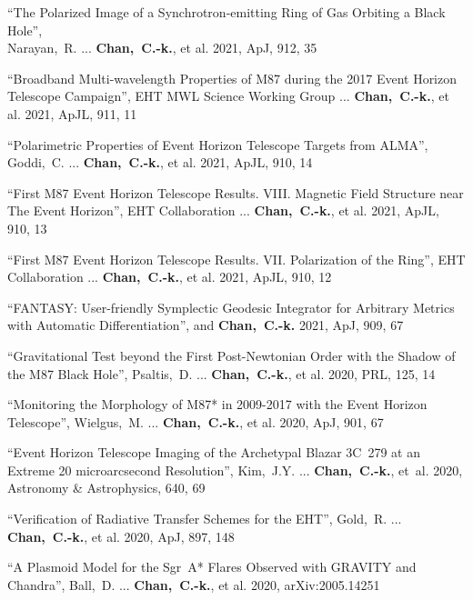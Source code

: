 \begin{ilist}
\item ``The Polarized Image of a Synchrotron-emitting Ring of Gas Orbiting a Black Hole'',\\
  Narayan,~R. ... \textbf{Chan,~C.-k.}, et al.
  2021, ApJ, 912, 35

\item ``Broadband Multi-wavelength Properties of M87 during the 2017 Event Horizon Telescope Campaign'',
  EHT MWL Science Working Group ... \textbf{Chan,~C.-k.}, et al.
  2021, ApJL, 911, 11

\item ``Polarimetric Properties of Event Horizon Telescope Targets from ALMA'',
  Goddi,~C. ... \textbf{Chan,~C.-k.}, et al.
  2021, ApJL, 910, 14

\item ``First M87 Event Horizon Telescope Results. VIII. Magnetic Field Structure near The Event Horizon'',
  EHT Collaboration ... \textbf{Chan,~C.-k.}, et al.
  2021, ApJL, 910, 13

\item ``First M87 Event Horizon Telescope Results. VII. Polarization of the Ring'',
  EHT Collaboration ... \textbf{Chan,~C.-k.}, et al.
  2021, ApJL, 910, 12

\item ``FANTASY: User-friendly Symplectic Geodesic Integrator for Arbitrary Metrics with Automatic Differentiation'',
   and \textbf{Chan,~C.-k.}
  2021, ApJ, 909, 67

\item ``Gravitational Test beyond the First Post-Newtonian Order with the Shadow of the M87 Black Hole'',
  Psaltis,~D. ... \textbf{Chan,~C.-k.}, et al.
  2020, PRL, 125, 14

\item ``Monitoring the Morphology of M87* in 2009-2017 with the Event Horizon Telescope'',
  Wielgus,~M. ... \textbf{Chan,~C.-k.}, et al.
  2020, ApJ, 901, 67

\item ``Event Horizon Telescope Imaging of the Archetypal Blazar 3C~279 at an Extreme 20 microarcsecond Resolution'',
  Kim,~J.Y. ... \textbf{Chan,~C.-k.}, et~al.
  2020, Astronomy \& Astrophysics, 640, 69

\item ``Verification of Radiative Transfer Schemes for the EHT'',
  Gold,~R. ... \textbf{Chan,~C.-k.}, et al.
  2020, ApJ, 897, 148

\item ``A Plasmoid Model for the Sgr~A* Flares Observed with GRAVITY and Chandra'',
  Ball,~D. ... \textbf{Chan,~C.-k.}, et al.
  2020, arXiv:2005.14251


\end{ilist}
